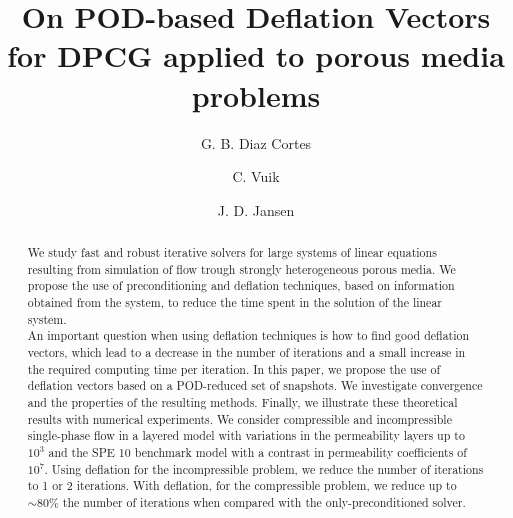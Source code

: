 \documentclass[12pt]{article}
\title{On POD-based Deflation Vectors for DPCG applied to porous media problems}
\author[1]{G. B. Diaz Cortes}
\author[1]{C. Vuik}
\author[2]{J. D. Jansen}
\affil[1]{Department of Applied Mathematics, TU Delft}
\affil[2]{Department of Geoscience \& Engineering, TU Delft}
\begin{document}

\maketitle
\begin{abstract}
     We study fast and robust iterative solvers for large systems of linear equations resulting from simulation of flow trough strongly heterogeneous porous media. We propose the use of preconditioning and deflation techniques, based on information obtained from the system, to reduce the time spent in the solution of the linear system.\\
     An important question when using deflation techniques is how to find good deflation vectors, which lead to a decrease in the number of iterations and a small increase in the required computing time per iteration. In this paper, we propose the use of deflation vectors based on a POD-reduced set of snapshots. We investigate convergence and the properties of the resulting methods. 
     Finally, we illustrate these theoretical results with numerical experiments.  
 We consider compressible and incompressible single-phase flow in a layered model with variations in the permeability layers up to $10^{3}$ and the SPE 10 benchmark model with a contrast in permeability coefficients of $10^{7}$. Using deflation for the incompressible problem, we reduce the number of iterations to 1 or 2 iterations. With deflation, for the compressible problem, we reduce up to $\sim 80\%$ the number of iterations when compared with the only-preconditioned solver.\\
\end{abstract}
\end{document}

